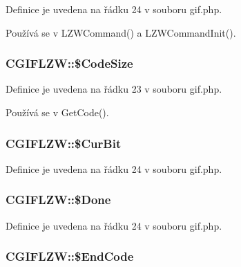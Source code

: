 Definice je uvedena na řádku 24 v souboru gif.\-php.



Používá se v L\-Z\-W\-Command() a L\-Z\-W\-Command\-Init().

\hypertarget{class_c_g_i_f_l_z_w_a852ba21e1a16e7f1075aa0f87e91e7f3}{
\subsubsection[{\$\-Code\-Size}]{\setlength{\rightskip}{0pt plus 5cm}C\-G\-I\-F\-L\-Z\-W\-::\$\-Code\-Size}}\label{class_c_g_i_f_l_z_w_a852ba21e1a16e7f1075aa0f87e91e7f3}


Definice je uvedena na řádku 23 v souboru gif.\-php.



Používá se v Get\-Code().

\hypertarget{class_c_g_i_f_l_z_w_a9c70e31ce175975d7499d7fb5982c24a}{
\subsubsection[{\$\-Cur\-Bit}]{\setlength{\rightskip}{0pt plus 5cm}C\-G\-I\-F\-L\-Z\-W\-::\$\-Cur\-Bit}}\label{class_c_g_i_f_l_z_w_a9c70e31ce175975d7499d7fb5982c24a}


Definice je uvedena na řádku 24 v souboru gif.\-php.

\hypertarget{class_c_g_i_f_l_z_w_a5e6b8609846fbbaba7fc007403995676}{
\subsubsection[{\$\-Done}]{\setlength{\rightskip}{0pt plus 5cm}C\-G\-I\-F\-L\-Z\-W\-::\$\-Done}}\label{class_c_g_i_f_l_z_w_a5e6b8609846fbbaba7fc007403995676}


Definice je uvedena na řádku 24 v souboru gif.\-php.

\hypertarget{class_c_g_i_f_l_z_w_add93ec110af125c91fba8e25c2e92179}{
\subsubsection[{\$\-End\-Code}]{\setlength{\rightskip}{0pt plus 5cm}C\-G\-I\-F\-L\-Z\-W\-::\$\-End\-Code}}\label{class_c_g_i_f_l_z_w_add93ec110af125c91fba8e25c2e92179}


